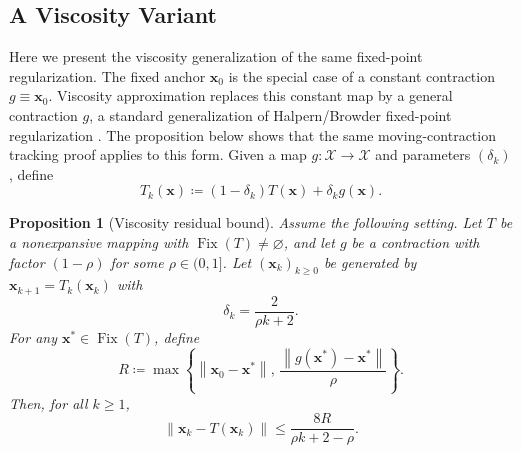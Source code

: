 \documentclass[letterpaper,11pt]{article}
\newcommand{\norm}[1]{\left\| #1 \right\|}
\newcommand{\braces}[1]{\left\{ #1 \right \}}
\newcommand{\vect}[1]{\mathbf{#1}}
\newtheorem{proposition}{Proposition}
\begin{document}
\subsection{A Viscosity Variant}\label{app:viscosity}
Here we present the viscosity generalization of the same fixed-point
regularization. The fixed anchor \(\vect{x}_0\) is the special case of a
constant contraction \(g\equiv\vect{x}_0\). Viscosity approximation replaces
this constant map by a general contraction \(g\), a standard generalization of
Halpern/Browder fixed-point regularization
\cite{moudafi2000viscosity,xu2004viscosity}. The proposition below shows that
the same moving-contraction tracking proof applies to this form. Given a map
\(g:\mathcal X\to\mathcal X\) and parameters \((\delta_k)\), define
\begin{equation}\label{eq:halpern_viscosity}
    T_k(\vect{x}) \coloneqq (1-\delta_k)T(\vect{x})+\delta_k g(\vect{x}).
\end{equation}

\begin{proposition}[Viscosity residual bound]\label{prop:halpern_viscosity}
Assume the following setting. Let \(T\) be a nonexpansive mapping with \(\operatorname{Fix}(T)\ne\varnothing\), and let \(g\) be a contraction with factor \((1-\rho)\) for some \(\rho\in(0,1]\). Let \((\vect{x}_k)_{k\ge0}\) be generated by \(\vect{x}_{k+1}=T_k(\vect{x}_k)\) with
\[
    \delta_k=\frac{2}{\rho k+2}.
\]
For any $\vect{x}^*\in\operatorname{Fix}(T)$, define
\[
    R\coloneqq \max\braces{\norm{\vect{x}_0-\vect{x}^*},\,\frac{\norm{g(\vect{x}^*)-\vect{x}^*}}{\rho}}.
\]
Then, for all $k\ge1$,
\[
    \norm{\vect{x}_k-T(\vect{x}_k)}
    \le
    \frac{8R}{\rho k+2-\rho}.
\]
\end{proposition}
\end{document}
